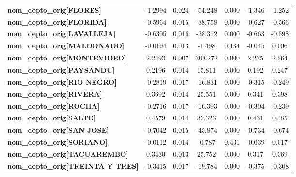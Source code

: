 \begin{center}
\begin{tabular}{lcccccc}
\textbf{nom\_depto\_orig[FLORES]}          &      -1.2994  &        0.024     &   -54.248  &         0.000        &       -1.346    &       -1.252     \\
\textbf{nom\_depto\_orig[FLORIDA]}         &      -0.5964  &        0.015     &   -38.758  &         0.000        &       -0.627    &       -0.566     \\
\textbf{nom\_depto\_orig[LAVALLEJA]}       &      -0.6305  &        0.016     &   -38.312  &         0.000        &       -0.663    &       -0.598     \\
\textbf{nom\_depto\_orig[MALDONADO]}       &      -0.0194  &        0.013     &    -1.498  &         0.134        &       -0.045    &        0.006     \\
\textbf{nom\_depto\_orig[MONTEVIDEO]}      &       2.2493  &        0.007     &   308.272  &         0.000        &        2.235    &        2.264     \\
\textbf{nom\_depto\_orig[PAYSANDU]}        &       0.2196  &        0.014     &    15.811  &         0.000        &        0.192    &        0.247     \\
\textbf{nom\_depto\_orig[RIO NEGRO]}       &      -0.2819  &        0.017     &   -16.831  &         0.000        &       -0.315    &       -0.249     \\
\textbf{nom\_depto\_orig[RIVERA]}          &       0.3692  &        0.014     &    25.551  &         0.000        &        0.341    &        0.398     \\
\textbf{nom\_depto\_orig[ROCHA]}           &      -0.2716  &        0.017     &   -16.393  &         0.000        &       -0.304    &       -0.239     \\
\textbf{nom\_depto\_orig[SALTO]}           &       0.4579  &        0.014     &    33.323  &         0.000        &        0.431    &        0.485     \\
\textbf{nom\_depto\_orig[SAN JOSE]}        &      -0.7042  &        0.015     &   -45.874  &         0.000        &       -0.734    &       -0.674     \\
\textbf{nom\_depto\_orig[SORIANO]}         &      -0.0112  &        0.014     &    -0.787  &         0.431        &       -0.039    &        0.017     \\
\textbf{nom\_depto\_orig[TACUAREMBO]}      &       0.3430  &        0.013     &    25.752  &         0.000        &        0.317    &        0.369     \\
\textbf{nom\_depto\_orig[TREINTA Y TRES]}  &      -0.3415  &        0.017     &   -19.784  &         0.000        &       -0.375    &       -0.308     \\

\end{tabular}
\end{center}
